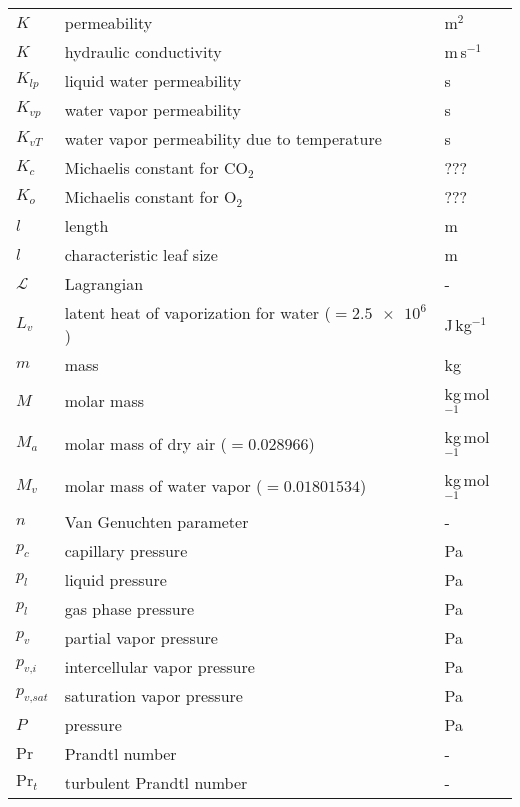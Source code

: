 \begin{longtable}{p{}p{}p{}}
	$K$ & permeability & m$^2$  \\ 
	$K$ & hydraulic conductivity & m\,s$^{-1}$  \\ 	
	$K_{\textit{lp}}$ & liquid water permeability & s \\ 	
	$K_{\textit{vp}}$ & water vapor permeability & s \\ 		
	$K_{\textit{vT}}$ & water vapor permeability due to temperature & s \\ 			
	$K_c$ & Michaelis constant for CO$_2$ & ??? \\ 	
	$K_o$ & Michaelis constant for O$_2$ & ??? \\ 		
	$l$ & length & m \\ 
	$l$ & characteristic leaf size & m \\ 	

	$\mathcal{L}$ & Lagrangian & - \\ 
	$L_v$ & latent heat of vaporization for water ($=\num{2.5e6}$) & J\,kg$^{-1}$ \\ 
	$m$ & mass & kg \\ 
	$M$ & molar mass & kg\,mol$^{-1}$ \\ 
	$M_a$ & molar mass of dry air ($=\num{0.028966}$) & kg\,mol$^{-1}$ \\ 	
	$M_v$ & molar mass of water vapor ($=\num{0.01801534}$) & kg\,mol$^{-1}$ \\ 		
	$n$ & Van Genuchten parameter & - \\
	$p_c$ & capillary pressure & Pa \\ 
	$p_l$ & liquid pressure & Pa \\ 	
	$p_l$ & gas phase pressure & Pa \\ 		
	$p_v$ & partial vapor pressure & Pa \\ 	
	$p_{\textit{v,i}}$ & intercellular vapor pressure & Pa \\ 			
	$p_{\textit{v,sat}}$ & saturation vapor pressure & Pa \\ 		
	$P$ & pressure & Pa \\ 
	$\mathrm{Pr}$ & Prandtl number & - \\ 	
	$\mathrm{Pr}_t$ & turbulent Prandtl number & - \\ 		



\end{longtable}
